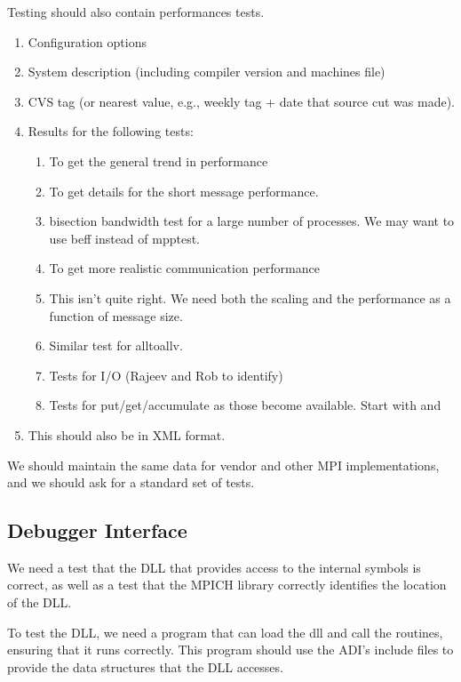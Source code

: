\documentclass{article}
\begin{document}
Testing should also contain performances tests.
\begin{enumerate}
\item Configuration options
\item System description (including compiler version and machines file)
\item CVS tag (or nearest value, e.g., weekly tag + date that source
cut was made).
\item Results for the following tests:
    \begin{enumerate}
    \item {} To get the general trend in performance
    \item {} To get details for the short message
performance. 
    \item bisection bandwidth test for a large number of processes.
    We may want to use beff instead of mpptest.
    \item {} To get more
    realistic communication performance
    \item {} This isn't quite right.
    We need both the scaling and the performance as a function of
    message size.
    \item Similar test for alltoallv. 
    \item Tests for I/O (Rajeev and Rob to identify)
    \item Tests for put/get/accumulate as those become available.
    Start with  and 
    \end{enumerate}
\item This should also be in XML format.
\end{enumerate}
We should maintain the same data for vendor and other MPI
implementations, and we should ask for a standard set of tests.  

\subsection{Debugger Interface}
We need a test that the DLL that provides access to the internal
symbols is correct, as well as a test that the MPICH library correctly
identifies the location of the DLL.

To test the DLL, we need a program  that can
load the dll and call the routines, ensuring that it runs correctly.
This program should use the ADI's include files to provide the data
structures that the DLL accesses.
\end{document}
